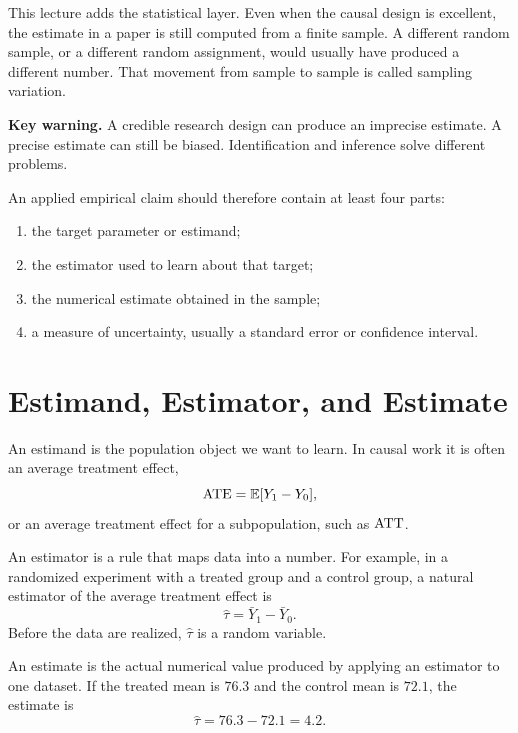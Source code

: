 This lecture adds the statistical layer. Even when the causal design is
excellent, the estimate in a paper is still computed from a finite sample. A
different random sample, or a different random assignment, would usually have
produced a different number. That movement from sample to sample is called
sampling variation.

\begin{boxF}
\textbf{Key warning.} A credible research design can produce an imprecise
estimate. A precise estimate can still be biased. Identification and inference
solve different problems.
\end{boxF}

An applied empirical claim should therefore contain at least four parts:
\begin{enumerate}
  \item the target parameter or estimand;
  \item the estimator used to learn about that target;
  \item the numerical estimate obtained in the sample;
  \item a measure of uncertainty, usually a standard error or confidence
  interval.
\end{enumerate}

\section{Estimand, Estimator, and Estimate}

\begin{defN}[Estimand]
An estimand is the population object we want to learn. In causal work it is
often an average treatment effect,
\[
  \mathrm{ATE} = \mathbb{E}[Y_1 - Y_0],
\]
or an average treatment effect for a subpopulation, such as $\mathrm{ATT}$.
\end{defN}

\begin{defN}[Estimator]
An estimator is a rule that maps data into a number. For example, in a
randomized experiment with a treated group and a control group, a natural
estimator of the average treatment effect is
\[
  \hat{\tau} = \bar{Y}_1 - \bar{Y}_0.
\]
Before the data are realized, $\hat{\tau}$ is a random variable.
\end{defN}

\begin{defN}[Estimate]
An estimate is the actual numerical value produced by applying an estimator to
one dataset. If the treated mean is $76.3$ and the control mean is $72.1$, the
estimate is
\[
  \hat{\tau} = 76.3 - 72.1 = 4.2.
\]
\end{defN}


